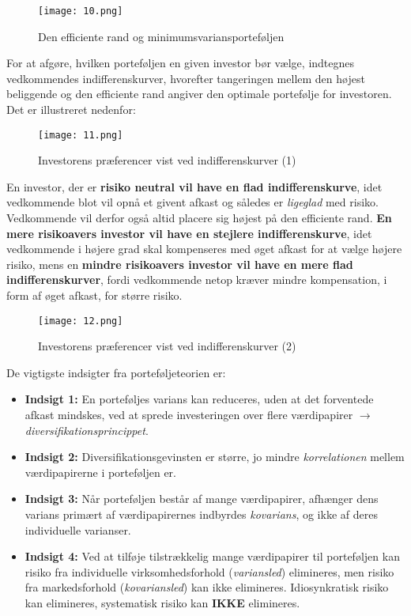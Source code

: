 \documentclass[10pt,reqno, usenames]{article}
\begin{document}
\begin{figure}[h]
     \centering
     \texttt{[image: 10.png]}
     \caption{Den efficiente rand og minimumsvariansporteføljen}
     \label{Figur 2}
\end{figure} 

For at afgøre, hvilken porteføljen en given investor bør vælge, indtegnes vedkommendes indifferenskurver, hvorefter tangeringen mellem den højest beliggende og den efficiente rand angiver den optimale portefølje for investoren. Det er illustreret nedenfor: 

\begin{figure}[h]
     \centering
     \texttt{[image: 11.png]}
     \caption{Investorens præferencer vist ved indifferenskurver (1)}
     \label{Figur 2}
\end{figure} 

En investor, der er \textbf{risiko neutral vil have en flad indifferenskurve}, idet vedkommende blot vil opnå et givent afkast og således er \textit{ligeglad} med risiko. Vedkommende vil derfor også altid placere sig højest på den efficiente rand. \textbf{En mere risikoavers investor vil have en stejlere indifferenskurve}, idet vedkommende i højere grad skal kompenseres med øget afkast for at vælge højere risiko, mens en \textbf{mindre risikoavers investor vil have en mere flad indifferenskurver}, fordi vedkommende netop kræver mindre kompensation, i form af øget afkast, for større risiko. 

\begin{figure}[h]
     \centering
     \texttt{[image: 12.png]}
     \caption{Investorens præferencer vist ved indifferenskurver (2)}
     \label{Figur 2}
\end{figure}

De vigtigste indsigter fra porteføljeteorien er: 

\begin{itemize}
    \item \textbf{Indsigt 1:} En porteføljes varians kan reduceres, uden at det forventede afkast mindskes, ved at sprede investeringen over flere værdipapirer $\rightarrow$ \textit{diversifikationsprincippet}.
    \item \textbf{Indsigt 2:} Diversifikationsgevinsten er større, jo mindre \textit{korrelationen} mellem værdipapirerne i porteføljen er.
    \item \textbf{Indsigt 3:} Når porteføljen består af mange værdipapirer, afhænger dens varians primært af værdipapirernes indbyrdes \textit{kovarians}, og ikke af deres individuelle varianser.
    \item \textbf{Indsigt 4:} Ved at tilføje tilstrækkelig mange værdipapirer til porteføljen kan risiko fra individuelle virksomhedsforhold (\textit{variansled}) elimineres, men risiko fra markedsforhold (\textit{kovariansled}) kan ikke elimineres. Idiosynkratisk risiko kan elimineres, systematisk risiko kan \textbf{IKKE} elimineres.
\end{itemize}
\end{document}
